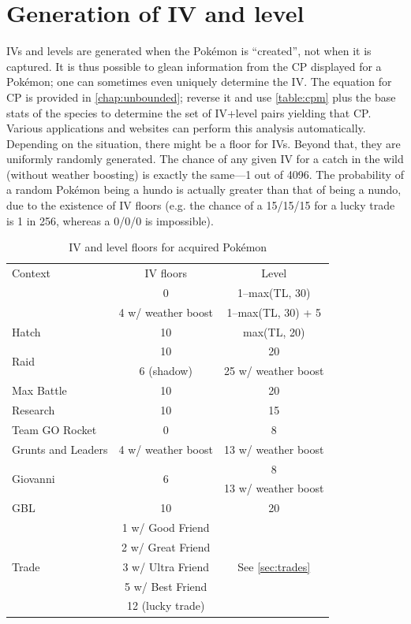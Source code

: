 \section{Generation of IV and level}
\label{sec:ivgeneration}
IVs and levels are generated when the Pokémon is ``created'', not when it is captured.
It is thus possible to glean information from the CP displayed for a Pokémon;
  one can sometimes even uniquely determine the IV\@.
The equation for CP is provided in \autoref{chap:unbounded}; reverse it and
  use \autoref{table:cpm} plus the base stats of the species to determine
  the set of IV+level pairs yielding that CP\@.
Various applications and websites can perform this analysis automatically.
Depending on the situation, there might be a floor for IVs.
Beyond that, they are uniformly randomly generated.
The chance of any given IV for a catch in the wild (without weather boosting)
  is exactly the same---1 out of 4096.
The probability of a random Pokémon being a hundo is actually
  greater than that of being a nundo, due to the existence of IV floors
  (e.g. the chance of a 15/15/15 for a lucky trade is 1 in 256, whereas
  a 0/0/0 is impossible).
\begin{table}
\centering
\begin{tabular}{lcc}
Context & IV floors & Level \\
\Midrule
\multirow{2}{*}{Wild catch} & 0 & 1--max(TL, 30) \\
& 4 w/ weather boost & 1--max(TL, 30) + 5 \\
Hatch & 10 & max(TL, 20) \\
\multirow{2}{*}{Raid} & 10 & 20 \\
& 6 (shadow) & 25 w/ weather boost \\
Max Battle & 10 & 20 \\
Research & 10 & 15 \\
Team GO Rocket & 0 & 8 \\
Grunts and Leaders & 4 w/ weather boost & 13 w/ weather boost \\
\multirow{2}{*}{Giovanni} & \multirow{2}{*}{6} & 8\\
& & 13 w/ weather boost\\
GBL & 10 & 20\\
\multirow{5}{*}{Trade} & 1 w/ Good Friend & \multirow{5}{*}{See \autoref{sec:trades}} \\
& 2 w/ Great Friend & \\
& 3 w/ Ultra Friend & \\
& 5 w/ Best Friend & \\
& 12 (lucky trade) & \\
\end{tabular}
\caption{IV and level floors for acquired Pokémon}
\label{table:ivfloors}
\end{table}


